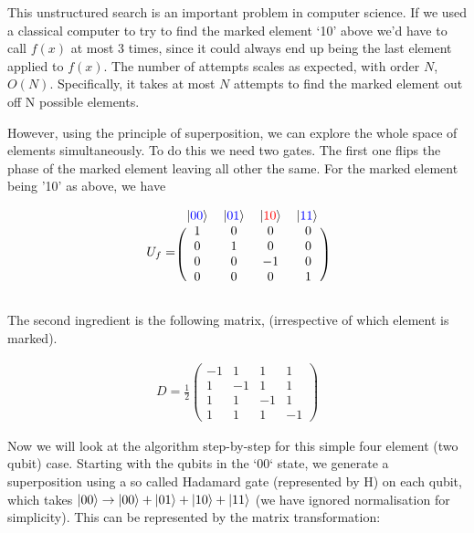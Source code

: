 This unstructured search is an important problem in computer science. If we used a classical computer to try to find the marked element `10' above we'd have to call $f(x)$ at most 3 times, since it could always end up being the last element applied to $f(x)$. The number of attempts scales as expected, with order $N$, $O(N)$. Specifically, it takes at most $N$ attempts to find the marked element out off N possible elements.

However, using the principle of superposition, we can explore the whole space of elements simultaneously. To do this we need two gates. The first one  flips the phase of the marked element leaving all other the same. For the marked element being '10' as above, we have

\begin{equation}
U_f = \begin{blockarray}{cccc}
    \ket{\textcolor{blue}{00}} & \ket{\textcolor{blue}{01}} & \ket{\textcolor{red}{10}} & \ket{\textcolor{blue}{11}} \\
    \begin{block}{(cccc)}
        1 & 0 & 0 & 0\\
        0 & 1 & 0 & 0\\
        0 & 0 & -1 & 0\\
        0 & 0 & 0 & 1\\
    \end{block}
\end{blockarray}
\end{equation}

The second ingredient is the following matrix, (irrespective of which element is marked).

\begin{align}
        D = \frac{1}{2}\begin{pmatrix}
        -1 & 1 & 1 & 1 \\
                 1 & -1 & 1 & 1\\
                 1  & 1 & -1 & 1 \\
                 1 & 1 & 1 & -1
        \end{pmatrix}
\end{align}

Now we will look at the algorithm step-by-step for this simple four element (two qubit) case. Starting with the qubits in the `00` state, we generate a superposition using a so called Hadamard gate (represented by H) on each qubit, which takes $\left\vert{00}\right\rangle \rightarrow \left\vert{00}\right\rangle + \left\vert{01}\right\rangle + \left\vert{10}\right\rangle + \left\vert{11}\right\rangle$ (we have ignored normalisation for simplicity). This can be represented by the matrix transformation:

